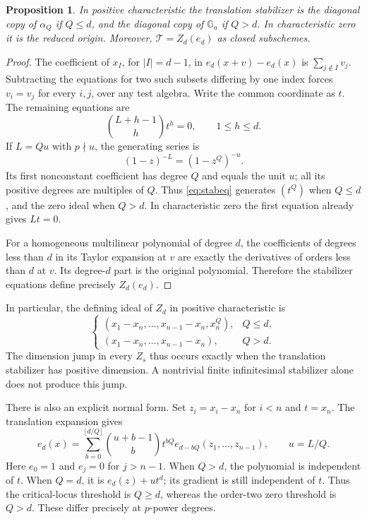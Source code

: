 \documentclass[11pt]{article}
\newtheorem{proposition}[theorem]{Proposition}
\theoremstyle{remark}
\newcommand{\Ga}{\mathbb G_a}
\begin{document}
\begin{proposition}\label{prop:stabilizer}
In positive characteristic the translation stabilizer is the
diagonal copy of $\alpha_Q$ if $Q\le d$, and the diagonal copy
of $\Ga$ if $Q>d$. In characteristic zero it is the reduced
origin. Moreover, $\mathcal T=Z_d(e_d)$ as closed subschemes.
\end{proposition}
\begin{proof}
The coefficient of $x_I$, for $|I|=d-1$, in
$e_d(x+v)-e_d(x)$ is $\sum_{j\notin I}v_j$. Subtracting the
equations for two such subsets differing by one index forces
$v_i=v_j$ for every $i,j$, over any test algebra. Write the common
coordinate as $t$. The remaining equations are
\begin{equation}
 \binom{L+h-1}{h}t^h=0,\qquad1\le h\le d.\label{eq:stabeq}
\end{equation}
If $L=Qu$ with $p\nmid u$, the generating series is
\[
 (1-z)^{-L}=(1-z^Q)^{-u}.
\]
Its first nonconstant coefficient has degree $Q$ and equals the
unit $u$; all its positive degrees are multiples of $Q$. Thus
\eqref{eq:stabeq} generates $(t^Q)$ when $Q\le d$, and the zero
ideal when $Q>d$. In characteristic zero the first equation
already gives $Lt=0$.

For a homogeneous multilinear polynomial of degree $d$, the
coefficients of degrees less than $d$ in its Taylor expansion
at $v$ are exactly the derivatives of orders less than $d$ at
$v$. Its degree-$d$ part is the original polynomial. Therefore
the stabilizer equations define precisely $Z_d(e_d)$.
\end{proof}

In particular, the defining ideal of $Z_d$ in positive characteristic
is
\[
 \begin{cases}
 (x_1-x_n,\ldots,x_{n-1}-x_n,x_n^Q),&Q\le d,\\
 (x_1-x_n,\ldots,x_{n-1}-x_n),&Q>d.
 \end{cases}
\]
The dimension jump in every $Z_s$ thus occurs exactly when the
translation stabilizer has positive dimension. A nontrivial finite
infinitesimal stabilizer alone does not produce this jump.

There is also an explicit normal form. Set $z_i=x_i-x_n$ for
$i<n$ and $t=x_n$. The translation expansion gives
\begin{equation}
 e_d(x)=\sum_{b=0}^{\lfloor d/Q\rfloor}
 \binom{u+b-1}{b}t^{bQ}e_{d-bQ}(z_1,\ldots,z_{n-1}),
 \qquad u=L/Q.\label{eq:normal}
\end{equation}
Here $e_0=1$ and $e_j=0$ for $j>n-1$. When $Q>d$, the
polynomial is independent of $t$. When $Q=d$, it is
$e_d(z)+ut^d$; its gradient is still independent of $t$.
Thus the critical-locus threshold is $Q\ge d$, whereas the
order-two zero threshold is $Q>d$. These differ precisely at
$p$-power degrees.
\end{document}
